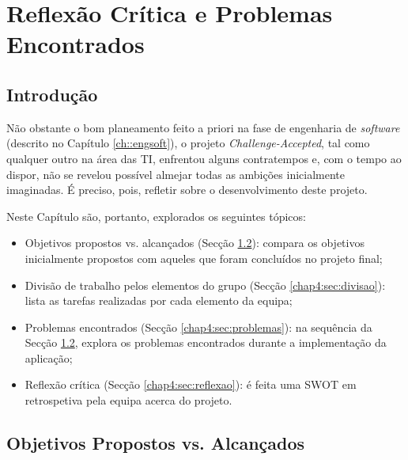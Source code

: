 \chapter{Reflexão Crítica e Problemas Encontrados}
\label{chap:reflexao}

\section{Introdução}
\label{chap4:sec:intro}

Não obstante o bom planeamento feito a priori na fase de engenharia de \emph{software} (descrito no Capítulo \ref{ch::engsoft}), o projeto \emph{Challenge-Accepted}, tal como qualquer outro na área das \ac{TI}, enfrentou alguns contratempos e, com o tempo ao dispor, não se revelou possível almejar todas as ambições inicialmente imaginadas. É preciso, pois, refletir sobre o desenvolvimento deste projeto. 
    
    Neste Capítulo são, portanto, explorados os seguintes tópicos:
\begin{itemize}
\item Objetivos propostos vs. alcançados (Secção \ref{chap4:sec:opvsoa}): compara os objetivos
inicialmente propostos com aqueles que foram concluídos no projeto final;
\item Divisão de trabalho pelos elementos do grupo (Secção \ref{chap4:sec:divisao}): lista as tarefas
realizadas por cada elemento da equipa;
\item Problemas encontrados (Secção \ref{chap4:sec:problemas}): na sequência da Secção \ref{chap4:sec:opvsoa}, explora
os problemas encontrados durante a implementação da aplicação;
\item Reflexão crítica (Secção \ref{chap4:sec:reflexao}): é feita uma \ac{SWOT} em retrospetiva pela equipa acerca do projeto.
\end{itemize}

\section{Objetivos Propostos vs. Alcançados}
\label{chap4:sec:opvsoa}

